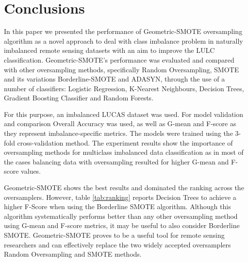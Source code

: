 \documentclass[parskip=full]{scrartcl}
\begin{document}
\section{Conclusions}

In this paper we presented the performance of Geometric-SMOTE oversampling
algorithm as a novel approach to deal with class imbalance problem in naturally
imbalanced remote sensing datasets  with an aim to improve the LULC
classification. Geometric-SMOTE's performance was evaluated and compared with
other oversampling methods, specifically Random Oversampling, SMOTE and its
variations Borderline-SMOTE and ADASYN, through the use of a number of
classifiers: Logistic Regression, K-Nearest Neighbours, Decision Trees,
Gradient Boosting Classifier and Random Forests.

For this purpose, an imbalanced LUCAS dataset was used. For model validation
and comparison Overall Accuracy was used, as well as G-mean and F-score as they
represent imbalance-specific metrics. The models were trained using the 3-fold
cross-validation method. The experiment results show the importance of
oversampling methods for multiclass imbalanced data classification as in most
of the cases balancing data with oversampling resulted for higher G-mean and F-
score values.

Geometric-SMOTE shows the best results and dominated the ranking across the
oversamplers. However, table \ref{tab:ranking} reports Decision Trees to
achieve a higher F-Score when using the Borderline SMOTE algorithm. Although
this algorithm systematically performs better than any other oversampling
method using G-mean and F-score metrics, it may be useful to also consider
Borderline SMOTE. Geometric-SMOTE proves to be a useful tool for remote sensing
researchers and can effectively replace the two widely accepted oversamplers
Random Oversampling and SMOTE methods.




\end{document}

